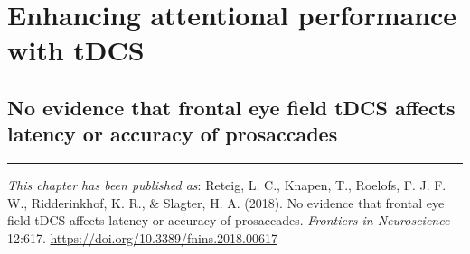 \documentclass[11pt,]{memoir}
\begin{document}
\hypertarget{part-tDCS}{%
\part{Enhancing attentional performance with tDCS}\label{part-tDCS}}

\hypertarget{sacc-tDCS}{%
\chapter{No evidence that frontal eye field tDCS affects latency or accuracy of prosaccades}\label{sacc-tDCS}}


\vspace*{\fill}

\begin{center}\rule{0.5\linewidth}{\linethickness}\end{center}

\small

\noindent
\emph{This chapter has been published as}: Reteig, L. C., Knapen, T., Roelofs, F. J. F. W., Ridderinkhof, K. R., \& Slagter, H. A. (2018). No evidence that frontal eye field tDCS affects latency or accuracy of prosaccades. \emph{Frontiers in Neuroscience} 12:617. \url{https://doi.org/10.3389/fnins.2018.00617}
\newpage
\normalsize
\end{document}
